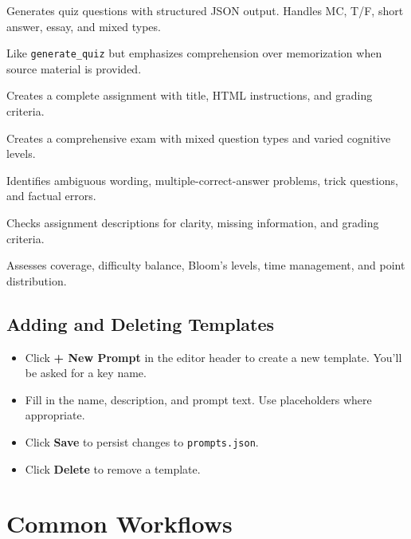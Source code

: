 \documentclass[12pt,letterpaper]{article}
\begin{document}
\begin{description}[leftmargin=*]
    \item[\texttt{generate\_quiz}] Generates quiz questions with structured JSON output. Handles MC, T/F, short answer, essay, and mixed types.
    \item[\texttt{generate\_from\_reading}] Like \texttt{generate\_quiz} but emphasizes comprehension over memorization when source material is provided.
    \item[\texttt{generate\_assignment}] Creates a complete assignment with title, HTML instructions, and grading criteria.
    \item[\texttt{generate\_exam}] Creates a comprehensive exam with mixed question types and varied cognitive levels.
    \item[\texttt{review\_quiz}] Identifies ambiguous wording, multiple-correct-answer problems, trick questions, and factual errors.
    \item[\texttt{review\_assignment}] Checks assignment descriptions for clarity, missing information, and grading criteria.
    \item[\texttt{review\_exam}] Assesses coverage, difficulty balance, Bloom's levels, time management, and point distribution.
\end{description}

\subsection{Adding and Deleting Templates}

\begin{itemize}[leftmargin=*]
    \item Click \textbf{+ New Prompt} in the editor header to create a new template. You'll be asked for a key name.
    \item Fill in the name, description, and prompt text. Use placeholders where appropriate.
    \item Click \textbf{Save} to persist changes to \texttt{prompts.json}.
    \item Click \textbf{Delete} to remove a template.
\end{itemize}


\section{Common Workflows}
\end{document}
